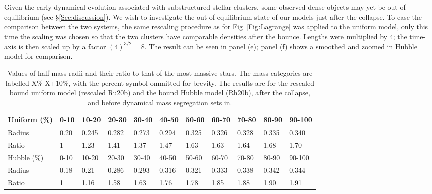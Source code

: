 Given the early dynamical evolution associated with substructured stellar clusters, some observed dense objects may yet be out of equilibrium (see \S\ref{Sec:discussion}). We wish to investigate the out-of-equilibrium state of our models just after the collapse. To ease the comparison between the two systems, the same rescaling procedure as for Fig~\ref{Fig:Lagrange} was applied to the uniform model, only this time the scaling was chosen so that the two clusters have comparable densities after the bounce. Lengths were multiplied by $4$; the time-axis is then scaled up by a factor $(4)^{3/2} = 8$. The result can be seen in panel (e); panel (f) shows a smoothed and zoomed in Hubble model for comparison.



\begin{table}
\caption{Values of half-mass radii and their ratio to that of the most massive stars. The mass categories are labelled X\%-X+10\%, with the percent symbol ommitted for brevity. The results are for the rescaled bound uniform model (rescaled Ru20b) and the bound Hubble model (Rh20b), after the collapse, and before dynamical mass segregation sets in.} \label{Tab:RhmVal}
\begin{center}
\begin{tabular}{l|llllllllll}
Uniform (\%) & 0-10 & 10-20 & 20-30 & 30-40 & 40-50 & 50-60 & 60-70 & 70-80 & 80-90 & 90-100 \\
\hline
Radius   & 0.20 & 0.245 & 0.282 & 0.273 & 0.294 & 0.325 & 0.326 &  0.328 & 0.335 & 0.340 \\
Ratio    & 1 & 1.23 & 1.41 & 1.37 & 1.47  & 1.63 & 1.63 &  1.64 & 1.68 & 1.70 \\

\hline
Hubble (\%) & 0-10 & 10-20 & 20-30 & 30-40 & 40-50 & 50-60 & 60-70 & 70-80 & 80-90 & 90-100 \\
\hline
Radius  &  0.18 & 0.21 & 0.286 & 0.293 & 0.316 & 0.321 & 0.333 & 0.338 & 0.342 & 0.344 \\
 Ratio       & 1 & 1.16 & 1.58 & 1.63 & 1.76  & 1.78  & 1.85 &  1.88 & 1.90 &  1.91 \\
\end{tabular}
\end{center}
\end{table}


